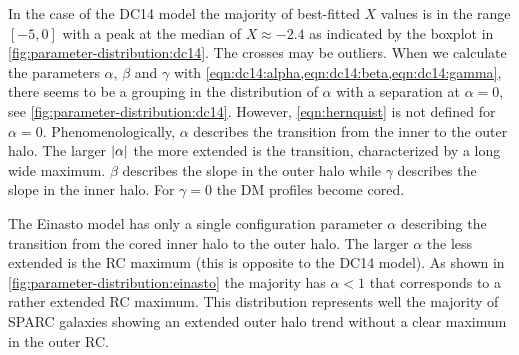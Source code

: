 In the case of the DC14 model the majority of best-fitted $X$ values is in the range $[-5, 0]$ with a peak at the median of $X \approx -2.4$ as indicated by the boxplot in \cref{fig:parameter-distribution:dc14}. The crosses may be outliers. When we calculate the parameters $\alpha$, $\beta$ and $\gamma$ with \cref{eqn:dc14:alpha,eqn:dc14:beta,eqn:dc14:gamma}, there seems to be a grouping in the distribution of $\alpha$ with a separation at $\alpha = 0$, see \cref{fig:parameter-distribution:dc14}. However, \cref{eqn:hernquist} is not defined for $\alpha = 0$. Phenomenologically, $\alpha$ describes the transition from the inner to the outer halo. The larger $\left|\alpha\right|$ the more extended is the transition, characterized by a long wide maximum. $\beta$ describes the slope in the outer halo while $\gamma$ describes the slope in the inner halo. For $\gamma = 0$ the DM profiles become cored.

The Einasto model has only a single configuration parameter $\alpha$ describing the transition from the cored inner halo to the outer halo. The larger $\alpha$ the less extended is the RC maximum (this is opposite to the DC14 model). As shown in \cref{fig:parameter-distribution:einasto} the majority has $\alpha < 1$ that corresponds to a rather extended RC maximum. This distribution represents well the majority of SPARC galaxies showing an extended outer halo trend without a clear maximum in the outer RC.

